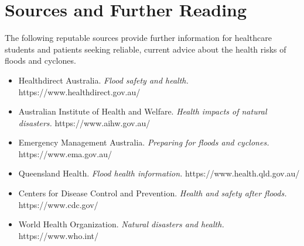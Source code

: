 \section*{Sources and Further Reading}
The following reputable sources provide further information for healthcare students and patients seeking reliable, current advice about the health risks of floods and cyclones.
\begin{itemize}
    \item Healthdirect Australia. \textit{Flood safety and health.} https://www.healthdirect.gov.au/
    \item Australian Institute of Health and Welfare. \textit{Health impacts of natural disasters.} https://www.aihw.gov.au/
    \item Emergency Management Australia. \textit{Preparing for floods and cyclones.} https://www.ema.gov.au/
    \item Queensland Health. \textit{Flood health information.} https://www.health.qld.gov.au/
    \item Centers for Disease Control and Prevention. \textit{Health and safety after floods.} https://www.cdc.gov/
    \item World Health Organization. \textit{Natural disasters and health.} https://www.who.int/
\end{itemize}
